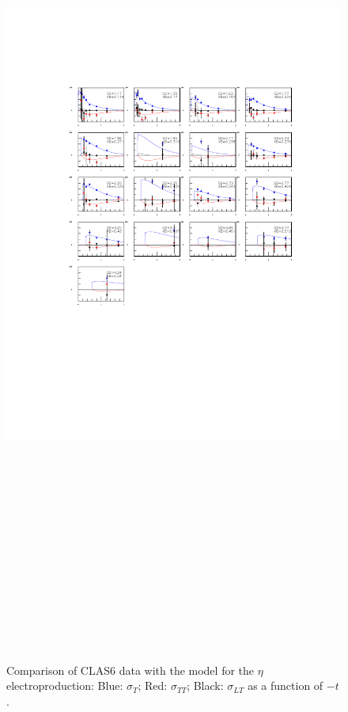 \documentclass[prc,floatfix,superscriptaddress]{revtex4}
\begin{document}

\begin{figure}[t!]
\vspace*{-10 mm}
\centerline{
\includegraphics[height=30cm]{../Test_plots/eta_sf.pdf}
}
\label{eta_sf}
\vspace*{-70mm}
\caption{Comparison of CLAS6 data with the model for the $\eta$ electroproduction:
Blue: $\sigma_T$;
Red: $\sigma_{TT}$;
Black: $\sigma_{LT}$ as a function of $-t$.
}
\label{fig:eta_sf}
\end{figure}
\end{document}
